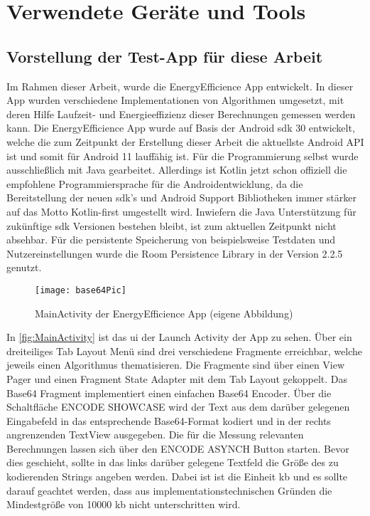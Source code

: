 \chapter{Verwendete Geräte und Tools}
\section{Vorstellung der Test-App für diese Arbeit}
Im Rahmen dieser Arbeit, wurde die \glqq EnergyEfficience\grqq{} App entwickelt. In dieser App wurden verschiedene Implementationen von Algorithmen umgesetzt, mit deren Hilfe Laufzeit- und Energieeffizienz dieser Berechnungen gemessen werden kann.
Die \glqq EnergyEfficience\grqq{} App wurde auf Basis der Android \ac{sdk} 30 entwickelt, welche die zum Zeitpunkt der Erstellung dieser Arbeit die aktuellste Android API ist und somit für Android 11 lauffähig ist. Für die Programmierung selbst wurde ausschließlich mit Java gearbeitet. Allerdings ist Kotlin jetzt schon offiziell die empfohlene Programmiersprache für die Androidentwicklung, da die Bereitstellung der neuen \ac{sdk}'s und Android Support Bibliotheken immer stärker auf das Motto \glqq Kotlin-first\grqq{} \cite{kotlin-first} umgestellt wird. Inwiefern die Java Unterstützung für zukünftige \ac{sdk} Versionen bestehen bleibt, ist zum aktuellen Zeitpunkt nicht absehbar.
Für die persistente Speicherung von beispielsweise Testdaten und Nutzereinstellungen wurde die Room Persistence Library in der Version 2.2.5 genutzt.
\begin{figure}[H]
	\begin{center}	 
	\texttt{[image: base64Pic]}
	\caption{MainActivity der EnergyEfficience App (eigene Abbildung)}
	\label{fig:MainActivity} 
	\end{center}
\end{figure}
In \autoref{fig:MainActivity} ist das \ac{ui} der Launch Activity der App zu sehen. Über ein dreiteiliges Tab Layout Menü sind drei verschiedene Fragmente erreichbar, welche jeweils einen Algorithmus thematisieren. Die Fragmente sind über einen View Pager und einen Fragment State Adapter mit dem Tab Layout gekoppelt. Das Base64 Fragment implementiert einen einfachen Base64 Encoder. Über die Schaltfläche \glqq ENCODE SHOWCASE\grqq{} wird der Text aus dem darüber gelegenen Eingabefeld in das entsprechende Base64-Format kodiert und in der rechts angrenzenden TextView ausgegeben. Die für die Messung relevanten Berechnungen lassen sich über den \glqq ENCODE ASYNCH\grqq{} Button starten. Bevor dies geschieht, sollte in das links darüber gelegene Textfeld die Größe des zu kodierenden Strings angeben werden. Dabei ist ist die Einheit \ac{kb} und es sollte darauf geachtet werden, dass aus implementationstechnischen Gründen die Mindestgröße von 10000 \ac{kb} nicht unterschritten wird. 
